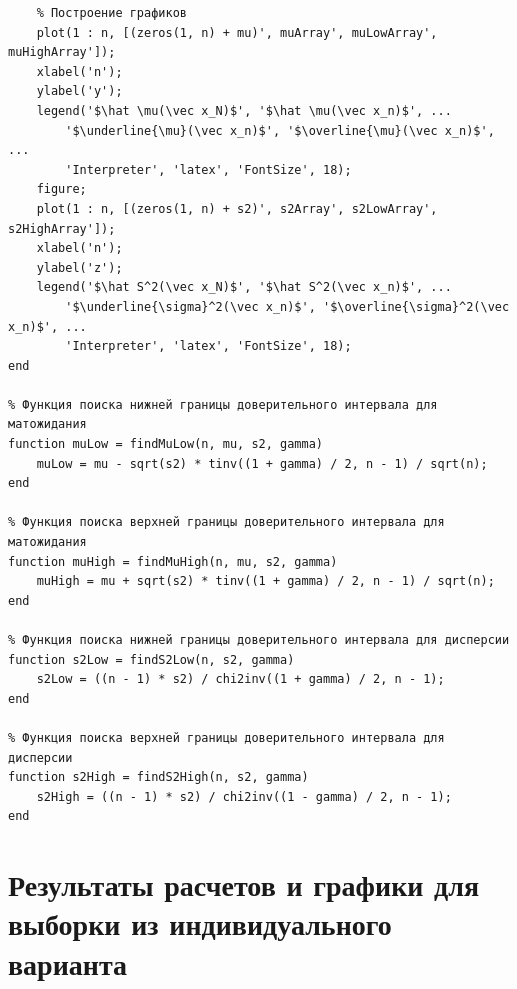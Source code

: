 \documentclass[a4paper,14pt]{extreport} %
\begin{document}
\begin{lstlisting}
    % Построение графиков
    plot(1 : n, [(zeros(1, n) + mu)', muArray', muLowArray', muHighArray']);
    xlabel('n');
    ylabel('y');
    legend('$\hat \mu(\vec x_N)$', '$\hat \mu(\vec x_n)$', ...
        '$\underline{\mu}(\vec x_n)$', '$\overline{\mu}(\vec x_n)$', ...
        'Interpreter', 'latex', 'FontSize', 18);
    figure;
    plot(1 : n, [(zeros(1, n) + s2)', s2Array', s2LowArray', s2HighArray']);
    xlabel('n');
    ylabel('z');
    legend('$\hat S^2(\vec x_N)$', '$\hat S^2(\vec x_n)$', ...
        '$\underline{\sigma}^2(\vec x_n)$', '$\overline{\sigma}^2(\vec x_n)$', ...
        'Interpreter', 'latex', 'FontSize', 18);
end

% Функция поиска нижней границы доверительного интервала для матожидания
function muLow = findMuLow(n, mu, s2, gamma)
    muLow = mu - sqrt(s2) * tinv((1 + gamma) / 2, n - 1) / sqrt(n);
end

% Функция поиска верхней границы доверительного интервала для матожидания
function muHigh = findMuHigh(n, mu, s2, gamma)
    muHigh = mu + sqrt(s2) * tinv((1 + gamma) / 2, n - 1) / sqrt(n);
end

% Функция поиска нижней границы доверительного интервала для дисперсии
function s2Low = findS2Low(n, s2, gamma)
    s2Low = ((n - 1) * s2) / chi2inv((1 + gamma) / 2, n - 1);
end

% Функция поиска верхней границы доверительного интервала для дисперсии
function s2High = findS2High(n, s2, gamma)
    s2High = ((n - 1) * s2) / chi2inv((1 - gamma) / 2, n - 1);
end
\end{lstlisting}

\section{Результаты расчетов и графики для выборки из индивидуального варианта} 
\end{document}

